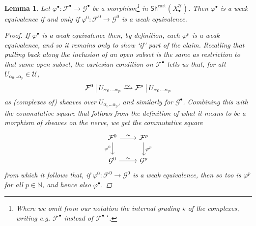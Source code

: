 \documentclass[11pt,fleqn]{article}
\theoremstyle{plain}
\newtheorem{lemma}[theorem]{Lemma}
\theoremstyle{definition}
\theoremstyle{remark}
\numberwithin{equation}{theorem}
\newcommand{\cover}{\mathcal{U}}
\newcommand{\anotherbullet}{\star}
\newcommand{\restricted}{\mathbin{\big\vert}}
\newcommand{\congto}{\xrightarrow{\raisebox{-.5ex}[0ex][0ex]{$\sim$}}}
\newcommand{\cartshX}{\mathsf{Sh}^\mathrm{cart}(X_\bullet^\cover)}
\begin{document}
        \begin{lemma}\label{lemma:weak-equivalences-in-cartshX}
            Let $\varphi^\bullet\colon\mathcal{F}^\bullet\to\mathcal{G}^\bullet$ be a morphism\footnote{Where we omit from our notation the internal grading $\anotherbullet$ of the complexes, writing e.g. $\mathcal{F}^\bullet$ instead of $\mathcal{F}^{\bullet,\anotherbullet}$.} in $\cartshX$.
            Then $\varphi^\bullet$ is a weak equivalence if and only if $\varphi^0\colon\mathcal{F}^0\to\mathcal{G}^0$ is a weak equivalence.
            \begin{proof}
                If $\varphi^\bullet$ is a weak equivalence then, by definition, each $\varphi^p$ is a weak equivalence, and so it remains only to show `if' part of the claim.
                Recalling that pulling back along the inclusion of an open subset is the same as restriction to that same open subset, the cartesian condition on $\mathcal{F}^\bullet$ tells us that, for all $U_{\alpha_0\ldots\alpha_p}\in\cover$,
                \[
                    \mathcal{F}^0 \restricted U_{\alpha_0\ldots\alpha_p}
                    \congto
                    \mathcal{F}^p \restricted U_{\alpha_0\ldots\alpha_p}
                \]
                as (complexes of) sheaves over $U_{\alpha_0\ldots\alpha_p}$, and similarly for $\mathcal{G}^\bullet$.
                Combining this with the commutative square that follows from the definition of what it means to be a morphism of sheaves on the nerve, we get the commutative square
                \[
                    \begin{tikzcd}
                        \mathcal{F}^0
                            \ar[r,"\sim"]
                            \ar[d,swap,"\varphi^0"]
                       &\mathcal{F}^p
                            \ar[d,"\varphi^p"]
                    \\  \mathcal{G}^0
                            \ar[r,"\sim"]
                       &\mathcal{G}^p
                    \end{tikzcd}
                \]
                from which it follows that, if $\varphi^0\colon\mathcal{F}^0\to\mathcal{G}^0$ is a weak equivalence, then so too is $\varphi^p$ for all $p\in\mathbb{N}$, and hence also $\varphi^\bullet$.
            \end{proof}
        \end{lemma}
\end{document}
